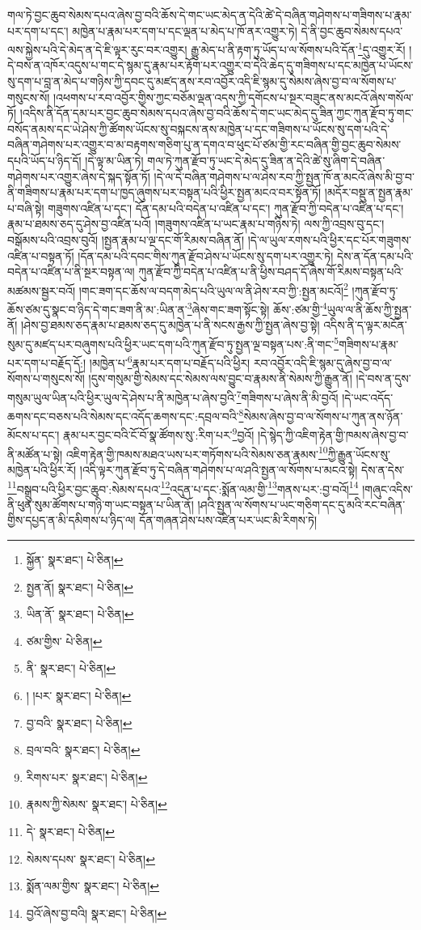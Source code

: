 གལ་ཏེ་བྱང་ཆུབ་སེམས་དཔའ་ཞེས་བྱ་བའི་ཆོས་དེ་གང་ཡང་མེད་ན་དེའི་ཚེ་དེ་བཞིན་གཤེགས་པ་གཟིགས་པ་རྣམ་པར་དག་པ་དང་། མཁྱེན་པ་རྣམ་པར་དག་པ་དང་ལྡན་པ་མེད་པ་ཁོ་ནར་འགྱུར་ཏེ། དེ་ནི་བྱང་ཆུབ་སེམས་དཔའ་ལས་སྐྱེས་པའི་དེ་མེད་ན་དེ་ཇི་ལྟར་རུང་བར་འགྱུར། རྒྱུ་མེད་པ་ནི་རྟག་ཏུ་ཡོད་པ་ལ་སོགས་པའི་དོན་\footnote{སྐྱོན་  སྣར་ཐང་།  པེ་ཅིན། }དུ་འགྱུར་རོ། །དེ་བས་ན་འཁོར་འདུས་པ་གང་དེ་སྙམ་དུ་རྣམ་པར་རྟོག་པར་འགྱུར་བ་དེའི་ཆེད་དུ་གཟིགས་པ་དང་མཁྱེན་པ་ཡོངས་སུ་དག་པ་བླ་ན་མེད་པ་གཉིས་ཀྱི་དབང་དུ་མཛད་ནས་རབ་འབྱོར་འདི་ཇི་སྙམ་དུ་སེམས་ཞེས་བྱ་བ་ལ་སོགས་པ་གསུངས་སོ། །འཕགས་པ་རབ་འབྱོར་གྱིས་ཀྱང་བཅོམ་ལྡན་འདས་ཀྱི་དགོངས་པ་སྔར་བཟུང་ནས་མངའོ་ཞེས་གསོལ་ཏོ། །འདིས་ནི་དོན་དམ་པར་བྱང་ཆུབ་སེམས་དཔའ་ཞེས་བྱ་བའི་ཆོས་དེ་གང་ཡང་མེད་དུ་ཟིན་ཀྱང་ཀུན་རྫོབ་ཏུ་གང་བསོད་ནམས་དང་ཡེ་ཤེས་ཀྱི་ཚོགས་ཡོངས་སུ་བསྐངས་ནས་མཁྱེན་པ་དང་གཟིགས་པ་ཡོངས་སུ་དག་པའི་དེ་བཞིན་གཤེགས་པར་འགྱུར་བ་མ་བརྟགས་གཅིག་པུ་ན་དགའ་བ་ཕུང་པོ་ཙམ་གྱི་རང་བཞིན་གྱི་བྱང་ཆུབ་སེམས་དཔའི་ཡོད་པ་ཉིད་དོ། །དེ་ལྟ་མ་ཡིན་ཏེ། གལ་ཏེ་ཀུན་རྫོབ་ཏུ་ཡང་དེ་མེད་དུ་ཟིན་ན་དེའི་ཚེ་སུ་ཞིག་དེ་བཞིན་གཤེགས་པར་འགྱུར་ཞེས་དེ་སྐད་སྟོན་ཏོ། །དེ་ལ་དེ་བཞིན་གཤེགས་པ་ལ་ཤེས་རབ་ཀྱི་སྤྱན་ཁོ་ན་མངའོ་ཞེས་མི་བྱ་བ་ནི་གཟིགས་པ་རྣམ་པར་དག་པ་ཁྱད་ཞུགས་པར་བསྟན་པའི་ཕྱིར་སྤྱན་མངའ་བར་སྟོན་ཏོ། །མདོར་བསྡུ་ན་སྤྱན་རྣམ་པ་བཞི་སྟེ། གཟུགས་འཛིན་པ་དང་། དོན་དམ་པའི་བདེན་པ་འཛིན་པ་དང་། ཀུན་རྫོབ་ཀྱི་བདེན་པ་འཛིན་པ་དང་། རྣམ་པ་ཐམས་ཅད་དུ་ཤེས་བྱ་འཛིན་པའོ། །གཟུགས་འཛིན་པ་ཡང་རྣམ་པ་གཉིས་ཏེ། ལས་ཀྱི་འབྲས་བུ་དང་། བསྒོམས་པའི་འབྲས་བུའོ། །སྤྱན་རྣམ་པ་ལྔ་དང་གོ་རིམས་བཞིན་ནོ། །དེ་ལ་ཡུལ་རགས་པའི་ཕྱིར་དང་པོར་གཟུགས་འཛིན་པ་བསྟན་ཏོ། །དོན་དམ་པའི་དབང་གིས་ཀུན་རྫོབ་ཤེས་པ་ཡོངས་སུ་དག་པར་འགྱུར་ཏེ། དེས་ན་དོན་དམ་པའི་བདེན་པ་འཛིན་པ་ནི་སྔར་བསྟན་ལ། ཀུན་རྫོབ་ཀྱི་བདེན་པ་འཛིན་པ་ནི་ཕྱིས་བཤད་དོ་ཞེས་གོ་རིམས་བསྟན་པའི་མཚམས་སྦྱར་བའོ། །གང་ཟག་དང་ཆོས་ལ་བདག་མེད་པའི་ཡུལ་ལ་ནི་ཤེས་རབ་ཀྱི་:སྤྱན་མངའོ།\footnote{སྤྱན་ནོ།  སྣར་ཐང་།  པེ་ཅིན། } །ཀུན་རྫོབ་ཏུ་ཆོས་ཙམ་དུ་སྣང་བ་ཉིད་དེ་གང་ཟག་ནི་མ་:ཡིན་ན་\footnote{ཡིན་ནོ་  སྣར་ཐང་།  པེ་ཅིན། }ཞེས་གང་ཟག་སྟོང་སྟེ། ཆོས་:ཙམ་གྱི་\footnote{ཙམ་གྱིས་  པེ་ཅིན། }ཡུལ་ལ་ནི་ཆོས་ཀྱི་སྤྱན་ནོ། །ཤེས་བྱ་ཐམས་ཅད་རྣམ་པ་ཐམས་ཅད་དུ་མཁྱེན་པ་ནི་སངས་རྒྱས་ཀྱི་སྤྱན་ཞེས་བྱ་སྟེ། འདིས་ནི་ད་ལྟར་མངོན་སུམ་དུ་མཛད་པར་བཞུགས་པའི་ཕྱིར་ཡང་དག་པའི་ཀུན་རྫོབ་ཏུ་སྤྱན་ལྔ་བསྟན་པས་:ནི་གང་\footnote{ནི་  སྣར་ཐང་།  པེ་ཅིན། }གཟིགས་པ་རྣམ་པར་དག་པ་བརྗོད་དོ:། །མཁྱེན་པ་\footnote{། །པར་  སྣར་ཐང་།  པེ་ཅིན། }རྣམ་པར་དག་པ་བརྗོད་པའི་ཕྱིར། རབ་འབྱོར་འདི་ཇི་སྙམ་དུ་ཞེས་བྱ་བ་ལ་སོགས་པ་གསུངས་སོ། །དུས་གསུམ་གྱི་སེམས་དང་སེམས་ལས་བྱུང་བ་རྣམས་ནི་སེམས་ཀྱི་རྒྱུན་ནོ། །དེ་བས་ན་དུས་གསུམ་ཡུལ་ཡིན་པའི་ཕྱིར་ཡུལ་དེ་ཤེས་པ་ནི་མཁྱེན་པ་ཞེས་བྱའི་\footnote{བྱ་བའི་  སྣར་ཐང་།  པེ་ཅིན། }གཟིགས་པ་ཞེས་ནི་མི་བྱའོ། །དེ་ཡང་འདོད་ཆགས་དང་བཅས་པའི་སེམས་དང་འདོད་ཆགས་དང་:དབྲལ་བའི་\footnote{བྲལ་བའི་  སྣར་ཐང་།  པེ་ཅིན། }སེམས་ཞེས་བྱ་བ་ལ་སོགས་པ་ཀུན་ནས་ཉོན་མོངས་པ་དང་། རྣམ་པར་བྱང་བའི་ངོ་བོ་སྣ་ཚོགས་སུ་:རིག་པར་\footnote{རིགས་པར་  སྣར་ཐང་།  པེ་ཅིན། }བྱའོ། །དེ་སྙེད་ཀྱི་འཇིག་རྟེན་གྱི་ཁམས་ཞེས་བྱ་བ་ནི་མཚོན་པ་སྟེ། འཇིག་རྟེན་གྱི་ཁམས་མཐའ་ཡས་པར་གཏོགས་པའི་སེམས་ཅན་རྣམས་\footnote{རྣམས་ཀྱི་སེམས་  སྣར་ཐང་།  པེ་ཅིན། }ཀྱི་རྒྱུན་ཡོངས་སུ་མཁྱེན་པའི་ཕྱིར་རོ། །འདི་ལྟར་ཀུན་རྫོབ་ཏུ་དེ་བཞིན་གཤེགས་པ་ལ་ཤའི་སྤྱན་ལ་སོགས་པ་མངའ་སྟེ། དེས་ན་དེས་\footnote{དེ་  སྣར་ཐང་།  པེ་ཅིན། }བསྒྲུབ་པའི་ཕྱིར་བྱང་ཆུབ་:སེམས་དཔའ་\footnote{སེམས་དཔས་  སྣར་ཐང་།  པེ་ཅིན། }འདུན་པ་དང་:སྨོན་ལམ་གྱི་\footnote{སྨོན་ལམ་གྱིས་  སྣར་ཐང་།  པེ་ཅིན། }གནས་པར་:བྱ་བའོ།\footnote{བྱའོ་ཞེས་བྱ་བའི།  སྣར་ཐང་།  པེ་ཅིན། } །གཞུང་འདིས་ནི་ཕུན་སུམ་ཚོགས་པ་གཉི་ག་ཡང་བསྟན་པ་ཡིན་ནོ། །ཤའི་སྤྱན་ལ་སོགས་པ་ཡང་གཅིག་དང་དུ་མའི་རང་བཞིན་གྱིས་དཔྱད་ན་མི་དམིགས་པ་ཉིད་ལ། དོན་གཞན་ཤེས་པས་འཛིན་པར་ཡང་མི་རིགས་ཏེ། 